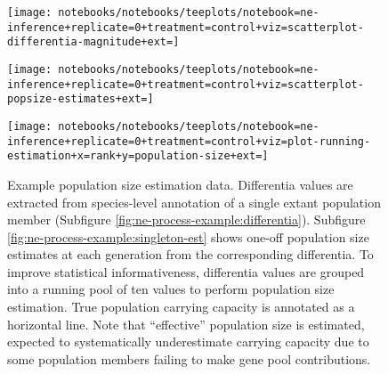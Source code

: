 \begin{figure}
  \centering

  \begin{minipage}{.65\textwidth}
    \centering
    \texttt{[image: notebooks/notebooks/teeplots/notebook=ne-inference+replicate=0+treatment=control+viz=scatterplot-differentia-magnitude+ext=]}
  \end{minipage}%
  \begin{minipage}{.25\textwidth}
    \label{fig:ne-process-example:differentia}
  \end{minipage}

  \vspace{0.25em}

  \begin{minipage}{.65\textwidth}
    \centering
    \texttt{[image: notebooks/notebooks/teeplots/notebook=ne-inference+replicate=0+treatment=control+viz=scatterplot-popsize-estimates+ext=]}
  \end{minipage}%
  \begin{minipage}{.25\textwidth}
    \label{fig:ne-process-example:singleton-est}
  \end{minipage}

  \vspace{0.25em}

  \begin{minipage}{.65\textwidth}
    \centering
    \texttt{[image: notebooks/notebooks/teeplots/notebook=ne-inference+replicate=0+treatment=control+viz=plot-running-estimation+x=rank+y=population-size+ext=]}
  \end{minipage}%
  \begin{minipage}{.25\textwidth}
    \label{fig:ne-process-example:running-est}
  \end{minipage}

  \caption{
    Example population size estimation data.
    Differentia values are extracted from species-level annotation of a single extant population member (Subfigure \ref{fig:ne-process-example:differentia}).
    Subfigure \ref{fig:ne-process-example:singleton-est} shows one-off population size estimates at each generation from the corresponding differentia.
    To improve statistical informativeness, differentia values are grouped into a running pool of ten values to perform population size estimation.
    True population carrying capacity is annotated as a horizontal line.
    Note that ``effective'' population size is estimated, expected to systematically underestimate carrying capacity due to some population members failing to make gene pool contributions.
  }
  \label{fig:ne-process-example}
\end{figure}


